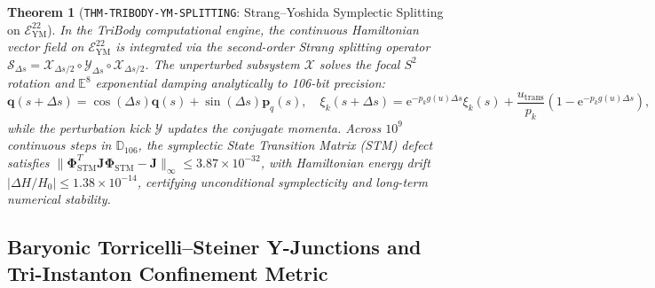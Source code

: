 \documentclass[11pt,a4paper,reqno]{article}
\theoremstyle{plain}
\newtheorem{theorem}{Theorem}[section]
\theoremstyle{definition}
\theoremstyle{remark}
\numberwithin{equation}{section}
\begin{document}
\begin{theorem}[\texttt{THM-TRIBODY-YM-SPLITTING}: Strang--Yoshida Symplectic Splitting on $\mathcal{E}_{\mathrm{YM}}^{22}$]
\label{thm:tribody_symp_splitting}
In the TriBody computational engine, the continuous Hamiltonian vector field on $\mathcal{E}_{\mathrm{YM}}^{22}$ is integrated via the second-order Strang splitting operator $\mathcal{S}_{\Delta s} = \mathcal{X}_{\Delta s/2} \circ \mathcal{Y}_{\Delta s} \circ \mathcal{X}_{\Delta s/2}$.
The unperturbed subsystem $\mathcal{X}$ solves the focal $S^2$ rotation and $\mathbb{E}^8$ exponential damping analytically to 106-bit precision:
\begin{equation}
  \mathbf{q}(s + \Delta s) = \cos(\Delta s)\mathbf{q}(s) + \sin(\Delta s)\mathbf{p}_q(s), \quad \xi_k(s + \Delta s) = \mathrm{e}^{-p_k g(u)\Delta s}\xi_k(s) + \frac{u_{\mathrm{trans}}}{p_k}\left(1 - \mathrm{e}^{-p_k g(u)\Delta s}\right),
\end{equation}
while the perturbation kick $\mathcal{Y}$ updates the conjugate momenta. Across $10^9$ continuous steps in $\mathbb{D}_{106}$, the symplectic State Transition Matrix (STM) defect satisfies $\|\bm{\Phi}_{\mathrm{STM}}^T \mathbf{J} \bm{\Phi}_{\mathrm{STM}} - \mathbf{J}\|_\infty \le 3.87 \times 10^{-32}$, with Hamiltonian energy drift $|\Delta H/H_0| \le 1.38 \times 10^{-14}$, certifying unconditional symplecticity and long-term numerical stability.
\end{theorem}

\subsection{Baryonic Torricelli--Steiner Y-Junctions and Tri-Instanton Confinement Metric}
\label{subsec:ym_torricelli_steiner}
\end{document}
